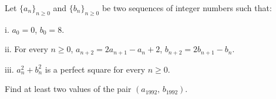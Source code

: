 Let $\{a_{n}\}_{n \geq 0}$ and $\{b_{n}\}_{n \geq 0}$ be two sequences of integer numbers such that:

i. $a_{0}=0$,  $b_{0}=8$.

ii. For every $n \geq 0$,  $a_{n+2}=2a_{n+1}-a_{n}+2$,  $b_{n+2}=2b_{n+1}-b_{n}$.

iii. $a_{n}^{2}+b_{n}^{2}$ is a perfect square for every $n \geq 0$.

Find at least two values of the pair $(a_{1992},\, b_{1992})$.